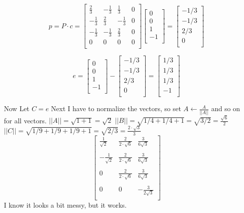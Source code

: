 \documentclass{article}
\begin{document}
\[
p
=
P\cdot c
=
\begin{bmatrix}
\frac{2}{3} & -\frac{1}{3} & \frac{1}{3} & 0 \\
-\frac{1}{3} & \frac{2}{3} & -\frac{1}{3} & 0 \\
-\frac{1}{3} & -\frac{1}{3} & \frac{2}{3} & 0 \\
0 & 0 & 0 & 0 \\
\end{bmatrix}
\begin{bmatrix}
0 \\
0 \\
1 \\
-1 \\
\end{bmatrix}
=
\begin{bmatrix}
-1/3 \\
-1/3 \\
2/3 \\
0 \\
\end{bmatrix}
\]

\[
e
=
\begin{bmatrix}
0 \\
0 \\
1 \\
-1 \\
\end{bmatrix}
-
\begin{bmatrix}
-1/3 \\
-1/3 \\
2/3 \\
0 \\
\end{bmatrix}
=
\begin{bmatrix}
1/3 \\
1/3 \\
1/3 \\
-1 \\
\end{bmatrix}
\]

Now Let $C = e$
\newline
Next I have to normalize the vectors, so set $A \leftarrow \frac{A}{||A||}$ and so on for all vectors.
$||A|| = \sqrt{1 + 1} = \sqrt{2}$
\newline
$||B|| = \sqrt{1/4 + 1/4 + 1} = \sqrt{3/2} = \frac{\sqrt{6}}{2}$
\newline
$||C|| = \sqrt{1/9 + 1/9 + 1/9 + 1} = \sqrt{2/3} = \frac{2\cdot \sqrt{3}}{3}$
\newline
\[
\begin{bmatrix}
\frac{1}{\sqrt{2}} & \frac{2}{2\cdot \sqrt{6}} & \frac{3}{6\sqrt{3}} \\
\\
-\frac{1}{\sqrt{2}} & \frac{2}{2\cdot \sqrt{6}} & \frac{3}{6\sqrt{3}} \\
\\
0 & \frac{2}{2\cdot \sqrt{6}} & \frac{3}{6\sqrt{3}} \\
\\
0 & 0 & -\frac{3}{2\sqrt{3}} \\
\end{bmatrix}
\]
I know it looks a bit messy, but it works.
\end{document}
